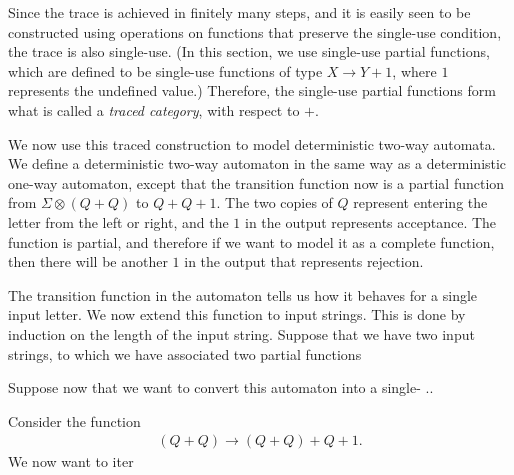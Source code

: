 Since the trace is achieved in finitely many steps, and it is easily seen to be constructed using operations on functions that preserve the single-use condition, the trace is also single-use. (In this section, we use single-use partial functions, which are defined to be single-use functions of type $X \to Y +1$, where $1$ represents the undefined value.) Therefore, the single-use partial functions form what is called a \emph{traced category}, with respect to $+$. 

We now use this traced construction to model deterministic two-way automata. We define a deterministic two-way automaton in the same way as a deterministic one-way automaton, except that the transition function now is a partial function from $\Sigma \otimes (Q + Q)$ to $Q + Q + 1$. 
The two copies of $Q$ represent entering the letter from the left or right, and the $1$ in the output represents acceptance.  The function is partial, and therefore if we want to model it as a complete function, then there will be another $1$ in the output that represents rejection.

The transition function in the automaton tells us how it behaves for a single input letter. We now extend this function to input strings. This is done by induction on the length of the input string. Suppose that we have two input strings, to which we have associated two partial functions 

Suppose now that we want to convert this automaton into a single- ..


Consider the function 
\begin{align*}
(Q+Q) \to (Q + Q) + Q + 1.
\end{align*}
We now want to iter

